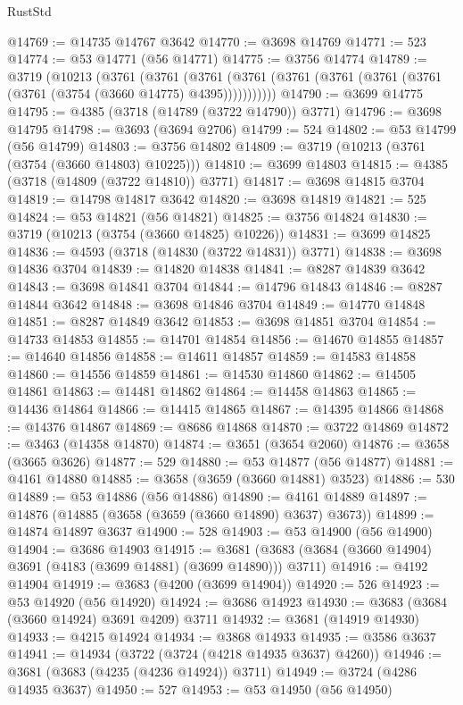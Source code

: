 \begin{lexlean}{RustStd}
\begin{coremodule}
{\begin{coremodule}
{{{{{{{{{{{{{{{{{{{{{{{{{{{{{{{{{{{{{{{{{{{{{{{@14769 := @14735 @14767 @3642
@14770 := @3698 @14769
@14771 := 523
@14774 := @53 @14771 (@56 @14771)
@14775 := @3756 @14774
@14789 := @3719
    (@10213
      (@3761
        (@3761
          (@3761 (@3761 (@3761 (@3761 (@3761 (@3761 (@3761 (@3754 (@3660 @14775) @4395)))))))))))
@14790 := @3699 @14775
@14795 := @4385 (@3718 (@14789 (@3722 @14790)) @3771)
@14796 := @3698 @14795
@14798 := @3693 (@3694 @2706)
@14799 := 524
@14802 := @53 @14799 (@56 @14799)
@14803 := @3756 @14802
@14809 := @3719 (@10213 (@3761 (@3754 (@3660 @14803) @10225)))
@14810 := @3699 @14803
@14815 := @4385 (@3718 (@14809 (@3722 @14810)) @3771)
@14817 := @3698 @14815 @3704
@14819 := @14798 @14817 @3642
@14820 := @3698 @14819
@14821 := 525
@14824 := @53 @14821 (@56 @14821)
@14825 := @3756 @14824
@14830 := @3719 (@10213 (@3754 (@3660 @14825) @10226))
@14831 := @3699 @14825
@14836 := @4593 (@3718 (@14830 (@3722 @14831)) @3771)
@14838 := @3698 @14836 @3704
@14839 := @14820 @14838
@14841 := @8287 @14839 @3642
@14843 := @3698 @14841 @3704
@14844 := @14796 @14843
@14846 := @8287 @14844 @3642
@14848 := @3698 @14846 @3704
@14849 := @14770 @14848
@14851 := @8287 @14849 @3642
@14853 := @3698 @14851 @3704
@14854 := @14733 @14853
@14855 := @14701 @14854
@14856 := @14670 @14855
@14857 := @14640 @14856
@14858 := @14611 @14857
@14859 := @14583 @14858
@14860 := @14556 @14859
@14861 := @14530 @14860
@14862 := @14505 @14861
@14863 := @14481 @14862
@14864 := @14458 @14863
@14865 := @14436 @14864
@14866 := @14415 @14865
@14867 := @14395 @14866
@14868 := @14376 @14867
@14869 := @8686 @14868
@14870 := @3722 @14869
@14872 := @3463 (@14358 @14870)
@14874 := @3651 (@3654 @2060)
@14876 := @3658 (@3665 @3626)
@14877 := 529
@14880 := @53 @14877 (@56 @14877)
@14881 := @4161 @14880
@14885 := @3658 (@3659 (@3660 @14881) @3523)
@14886 := 530
@14889 := @53 @14886 (@56 @14886)
@14890 := @4161 @14889
@14897 := @14876 (@14885 (@3658 (@3659 (@3660 @14890) @3637) @3673))
@14899 := @14874 @14897 @3637
@14900 := 528
@14903 := @53 @14900 (@56 @14900)
@14904 := @3686 @14903
@14915 := @3681 (@3683 (@3684 (@3660 @14904) @3691 (@4183 (@3699 @14881) (@3699 @14890))) @3711)
@14916 := @4192 @14904
@14919 := @3683 (@4200 (@3699 @14904))
@14920 := 526
@14923 := @53 @14920 (@56 @14920)
@14924 := @3686 @14923
@14930 := @3683 (@3684 (@3660 @14924) @3691 @4209) @3711
@14932 := @3681 (@14919 @14930)
@14933 := @4215 @14924
@14934 := @3868 @14933
@14935 := @3586 @3637
@14941 := @14934 (@3722 (@3724 (@4218 @14935 @3637) @4260))
@14946 := @3681 (@3683 (@4235 (@4236 @14924)) @3711)
@14949 := @3724 (@4286 @14935 @3637)
@14950 := 527
@14953 := @53 @14950 (@56 @14950)
}}}}}}}}}}}}}}}}}}}}}}}}}}}}}}}}}}}}}}}}}}}}}}}
\end{coremodule}}
\end{coremodule}
\end{lexlean}
